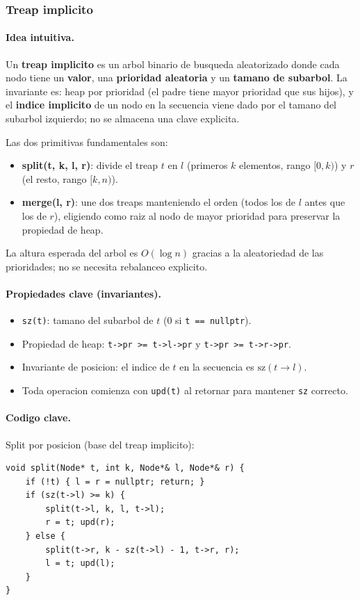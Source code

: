 \subsubsection{Treap implicito}

\paragraph{Idea intuitiva.}
Un \textbf{treap implicito} es un arbol binario de busqueda aleatorizado donde cada nodo tiene un \textbf{valor}, una \textbf{prioridad aleatoria} y un \textbf{tamano de subarbol}. La invariante es: heap por prioridad (el padre tiene mayor prioridad que sus hijos), y el \textbf{indice implicito} de un nodo en la secuencia viene dado por el tamano del subarbol izquierdo; no se almacena una clave explicita.

Las dos primitivas fundamentales son:
\begin{itemize}\setlength\itemsep{0pt}
	\item \textbf{split(t, k, l, r)}: divide el treap $t$ en $l$ (primeros $k$ elementos, rango $[0, k)$) y $r$ (el resto, rango $[k, n)$).
	\item \textbf{merge(l, r)}: une dos treaps manteniendo el orden (todos los de $l$ antes que los de $r$), eligiendo como raiz al nodo de mayor prioridad para preservar la propiedad de heap.
\end{itemize}

La altura esperada del arbol es $O(\log n)$ gracias a la aleatoriedad de las prioridades; no se necesita rebalanceo explicito.

\paragraph{Propiedades clave (invariantes).}
\begin{itemize}\setlength\itemsep{0pt}
	\item \verb|sz(t)|: tamano del subarbol de $t$ (0 si \verb|t == nullptr|).
	\item Propiedad de heap: \verb|t->pr >= t->l->pr| y \verb|t->pr >= t->r->pr|.
	\item Invariante de posicion: el indice de $t$ en la secuencia es $\text{sz}(t \to l)$.
	\item Toda operacion comienza con \verb|upd(t)| al retornar para mantener \verb|sz| correcto.
\end{itemize}

\paragraph{Codigo clave.}
Split por posicion (base del treap implicito):
\begin{verbatim}
void split(Node* t, int k, Node*& l, Node*& r) {
    if (!t) { l = r = nullptr; return; }
    if (sz(t->l) >= k) {
        split(t->l, k, l, t->l);
        r = t; upd(r);
    } else {
        split(t->r, k - sz(t->l) - 1, t->r, r);
        l = t; upd(l);
    }
}
\end{verbatim}

